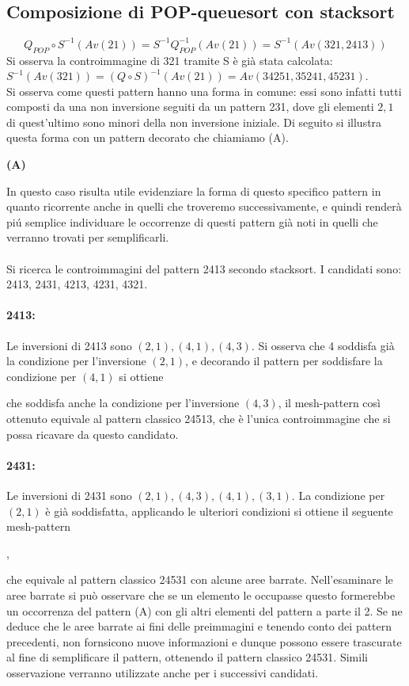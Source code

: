 \subsection{Composizione di {POP-queuesort} con {stacksort}} 
$$Q_{POP}\circ S^{-1}(Av(21)) = S^{-1}Q_{POP}^{-1}(Av(21)) = S^{-1}(Av(321, 2413))$$
Si osserva la controimmagine di 321 tramite S \`e gi\`a stata calcolata: $S^{-1}(Av(321)) = (Q\circ S)^{-1}(Av(21)) = Av(34251, 35241, 45231)$.\\
Si osserva come questi pattern hanno una forma in comune: essi sono infatti tutti composti da una non inversione seguiti da un pattern 231, dove gli elementi $2,1$ di quest'ultimo sono minori della non inversione iniziale. Di seguito si illustra questa forma con un pattern decorato che chiamiamo (A).
\begin{center}
\textbf{(A)}
\end{center}
In questo caso risulta utile evidenziare la forma di questo specifico pattern in quanto ricorrente anche in quelli che troveremo successivamente, e quindi render\`a pi\'u semplice individuare le occorrenze di questi pattern gi\`a noti in quelli che verranno trovati per semplificarli.\\\\
Si ricerca le controimmagini del pattern 2413 secondo stacksort. I candidati sono: 2413, 2431, 4213, 4231, 4321.
\paragraph*{2413:} Le inversioni di 2413 sono $(2,1),(4,1),(4,3)$. Si osserva che 4 soddisfa gi\`a la condizione per l'inversione $(2,1)$, e decorando il pattern per soddisfare la condizione per $(4,1)$ si ottiene
\begin{center}\end{center} che soddisfa anche la condizione per l'inversione $(4,3)$, il mesh-pattern cos\`i ottenuto equivale al pattern classico 24513, che \`e l'unica controimmagine che si possa ricavare da questo candidato.
\paragraph*{2431:} Le inversioni di 2431 sono $(2,1),(4,3),(4,1),(3,1)$. La condizione per $(2,1)$ \`e gi\`a soddisfatta, applicando le ulteriori condizioni si ottiene il seguente mesh-pattern
\begin{center}
,
\end{center}
che equivale al pattern classico 24531 con alcune aree barrate. Nell'esaminare le aree barrate si pu\`o osservare che se un elemento le occupasse questo formerebbe un occorrenza del pattern (A) con gli altri elementi del pattern a parte il 2. Se ne deduce che le aree barrate ai fini
delle preimmagini e tenendo conto dei pattern precedenti, non fornsicono nuove informazioni e dunque possono essere trascurate al fine di semplificare il pattern, ottenendo il pattern classico 24531. Simili osservazione verranno utilizzate anche per i successivi candidati. 
